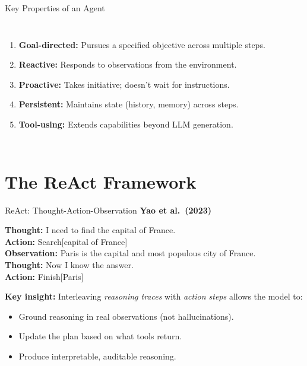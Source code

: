 \documentclass[aspectratio=169,10pt]{beamer}
\begin{document}
\begin{frame}{Key Properties of an Agent}
  \begin{columns}[T]
      \begin{enumerate}
        \item \textbf{Goal-directed:} Pursues a specified objective across multiple steps.
        \item \textbf{Reactive:} Responds to observations from the environment.
        \item \textbf{Proactive:} Takes initiative; doesn't wait for instructions.
        \item \textbf{Persistent:} Maintains state (history, memory) across steps.
        \item \textbf{Tool-using:} Extends capabilities beyond LLM generation.
      \end{enumerate}
      
  \end{columns}
\end{frame}

\section{The ReAct Framework}

\begin{frame}{ReAct: Thought-Action-Observation}
  \textbf{Yao et al.\ (2023)}~\cite{yao2023react}
  \vspace{0.4em}
  \begin{tcolorbox}[hitbox, title=ReAct Trace Format]
    \textbf{Thought:} I need to find the capital of France.\\
    \textbf{Action:} Search[capital of France]\\
    \textbf{Observation:} Paris is the capital and most populous city of France.\\[4pt]
    \textbf{Thought:} Now I know the answer.\\
    \textbf{Action:} Finish[Paris]
  \end{tcolorbox}
  \vspace{0.3em}
  \textbf{Key insight:} Interleaving \emph{reasoning traces} with \emph{action steps} allows the model to:
  \begin{itemize}
    \item Ground reasoning in real observations (not hallucinations).
    \item Update the plan based on what tools return.
    \item Produce interpretable, auditable reasoning.
  \end{itemize}
\end{frame}
\end{document}
